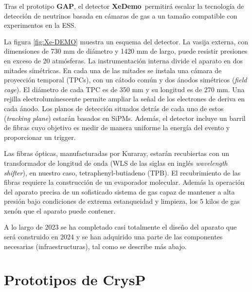 \documentclass[12pt,a4paper,article]{report} %
\def\xed{{\bf XeDemo}}
\def\crysp{{\bf CrysP}}
\begin{document}
Tras el prototipo {\bf GAP}, el detector 
\xed\ permitirá escalar la tecnología de detección de neutrinos basada en cámaras de gas a un tamaño compatible con experimentos en la ESS.

La figura \ref{fig:Xe-DEMO}  muestra un esquema del detector. La vasija externa, con dimensiones de 730 mm de diámetro y 1420 mm de largo, puede resistir presiones en exceso de 20 atmósferas. La instrumentación interna divide el aparato en dos mitades simétricas. En cada una de las mitades se instala una cámara de proyección temporal (TPCs), con un cátodo común y dos ánodos simétricos ({\em field cage}). El diámetro de cada TPC es de 350 mm y su longitud es de 270 mm.  Una rejilla electroluminescente permite ampliar la señal de los electrones de deriva en cada ánodo. Los planos de detección situados detrás de cada uno de estos ({\em tracking plane}) estarán basados en SiPMs. Además, el detector incluye un barril de fibras cuyo objetivo es medir de manera uniforme la energía del evento y proporcionar un trigger. 

Las fibras ópticas, manufacturadas por Kuraray, estarán recubiertas con un transformador de longitud de onda (WLS de las siglas en inglés {\em wavelength shifter}), en nuestro caso, tetraphenyl-butiadeno (TPB). El recubrimiento de las fibras requiere la construcción de un evaporador molecular. Además la operación del aparato precisa de un sofisticado sistema de gas capaz de mantener a alta presión bajo condiciones de extrema estanqueidad y limpieza, los 5 kilos de gas xenón que el aparato puede contener. 

A lo largo de 2023 se ha completado casi totalmente el diseño del aparato que será construido en 2024 y se han adquirido una parte de las componentes necesarias (infraestructuras), tal como se describe más abajo.  


\section*{Prototipos de \crysp}
\end{document}
